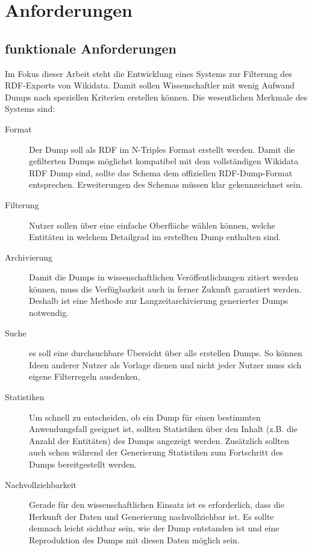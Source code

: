 \chapter{Anforderungen}

\section{funktionale Anforderungen}
Im Fokus dieser Arbeit steht die Entwicklung eines Systems zur Filterung des RDF-Exports von Wikidata.
Damit sollen Wissenschaftler mit wenig Aufwand Dumps nach speziellen Kriterien erstellen können.
Die wesentlichen Merkmale des Systems sind:

\begin{description}
  \item[Format] Der Dump soll als RDF im N-Triples Format erstellt werden. Damit die gefilterten Dumps möglichst kompatibel mit dem vollständigen Wikidata RDF Dump sind, sollte das Schema dem offiziellen RDF-Dump-Format entsprechen. Erweiterungen des Schemas müssen klar gekennzeichnet sein.
  \item[Filterung] Nutzer sollen über eine einfache Oberfläche wählen können, welche Entitäten in welchem Detailgrad im erstellten Dump enthalten sind. 
  \item[Archivierung] Damit die Dumps in wissenschaftlichen Veröffentlichungen zitiert werden können, muss die Verfügbarkeit auch in ferner Zukunft garantiert werden. Deshalb ist eine Methode zur Langzeitarchivierung generierter Dumps notwendig. 
  \item[Suche] es soll eine durchsuchbare Übersicht über alle erstellen Dumps.
    So können Ideen anderer Nutzer als Vorlage dienen und nicht jeder Nutzer muss sich eigene Filterregeln ausdenken,
  \item[Statistiken] Um schnell zu entscheiden, ob ein Dump für einen bestimmten Anwendungsfall geeignet ist, sollten Statistiken über den Inhalt (z.B. die Anzahl der Entitäten) des Dumps angezeigt werden. Zusätzlich sollten auch schon während der Generierung Statistiken zum Fortschritt des Dumps bereitgestellt werden.
  \item[Nachvollziehbarkeit] Gerade für den wissenschaftlichen Einsatz ist es erforderlich, dass die Herkunft der Daten und Generierung nachvollziehbar ist. Es sollte demnach leicht sichtbar sein, wie der Dump entstanden ist und eine Reproduktion des Dumps mit diesen Daten möglich sein. 
\end{description}

